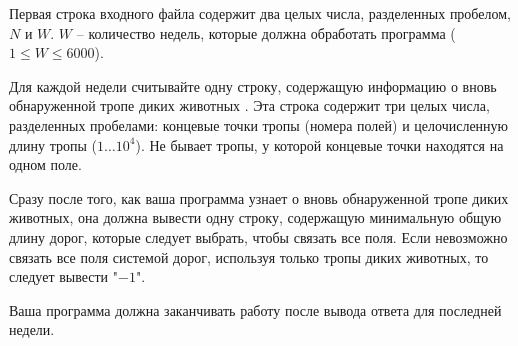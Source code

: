 Первая строка входного файла содержит два целых числа, разделенных
пробелом, $N$ и $W$. $W$ -- количество недель, которые должна обработать
программа ($1 \le W \le 6000$). 

Для каждой недели считывайте одну строку, содержащую информацию о вновь
обнаруженной тропе диких животных . Эта строка содержит три целых числа, 
разделенных пробелами: концевые точки тропы (номера полей) и
целочисленную длину тропы ($1 \ldots 10^4$). Не бывает тропы, у которой концевые
точки находятся на одном поле.

Сразу после того, как ваша программа узнает о вновь обнаруженной тропе диких
животных, она должна вывести одну строку, содержащую минимальную общую
длину дорог, которые следует выбрать, чтобы связать все поля. Если невозможно
связать все поля системой дорог, используя только тропы диких животных, то
следует вывести "$-1$". 

Ваша программа должна заканчивать работу после вывода ответа для последней
недели.
